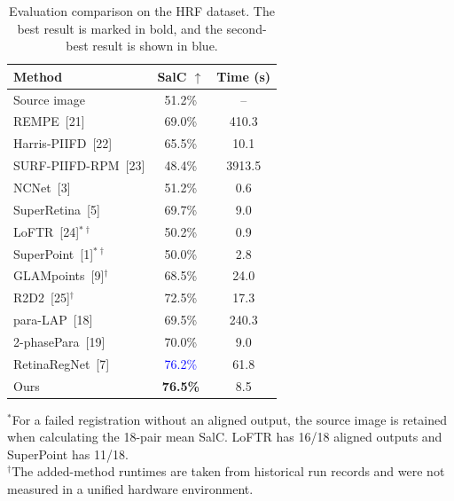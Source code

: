 \begin{table}[t]
  \caption{Evaluation comparison on the HRF dataset. The best result is
  marked in bold, and the second-best result is shown in blue.}
  \label{tab:hrf_comparison_extended}
  \centering
  \footnotesize
  \setlength{\tabcolsep}{4.2pt}
  \renewcommand{\arraystretch}{1.04}
  \begin{tabular}{@{}lcc@{}}
    \toprule
    Method & SalC $\uparrow$ & Time (s) \\
    \midrule
    Source image              & 51.2\%                 & --     \\
    REMPE~[21]                & 69.0\%                 & 410.3  \\
    Harris-PIIFD~[22]         & 65.5\%                 & 10.1   \\
    SURF-PIIFD-RPM~[23]       & 48.4\%                 & 3913.5 \\
    NCNet~[3]                 & 51.2\%                 & 0.6    \\
    SuperRetina~[5]           & 69.7\%                 & 9.0    \\
    LoFTR~[24]$^{*\dagger}$  & 50.2\%                 & 0.9    \\
    SuperPoint~[1]$^{*\dagger}$
                               & 50.0\%                 & 2.8    \\
    GLAMpoints~[9]$^{\dagger}$
                               & 68.5\%                 & 24.0   \\
    R2D2~[25]$^{\dagger}$    & 72.5\%                 & 17.3   \\
    para-LAP~[18]             & 69.5\%                 & 240.3  \\
    2-phasePara~[19]          & 70.0\%                 & 9.0    \\
    RetinaRegNet~[7]          & \textcolor{blue}{76.2\%}
                                                         & 61.8   \\
    Ours                      & \textbf{76.5\%}         & 8.5    \\
    \bottomrule
  \end{tabular}

  \vspace{2pt}
  \begin{minipage}{\columnwidth}
    \scriptsize
    $^{*}$For a failed registration without an aligned output, the source
    image is retained when calculating the 18-pair mean SalC. LoFTR has
    16/18 aligned outputs and SuperPoint has 11/18.\\
    $^{\dagger}$The added-method runtimes are taken from historical run
    records and were not measured in a unified hardware environment.
  \end{minipage}
\end{table}
